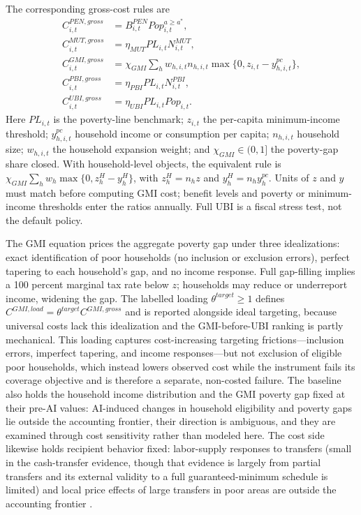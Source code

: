 \documentclass[11pt,a4paper]{article}
\begin{document}
The corresponding gross-cost rules are
\begin{align}
    C^{PEN,gross}_{i,t} &= B^{PEN}_{i,t}Pop_{i,t}^{a\geq a^*},\\
    C^{MUT,gross}_{i,t} &= \eta_{MUT}PL_{i,t}N^{MUT}_{i,t},\\
    C^{GMI,gross}_{i,t} &= \chi_{GMI}\sum_h w_{h,i,t}n_{h,i,t}\max\{0,z_{i,t}-y^{pc}_{h,i,t}\},\\
    C^{PBI,gross}_{i,t} &= \eta_{PBI}PL_{i,t}N^{PBI}_{i,t},\\
    C^{UBI,gross}_{i,t} &= \eta_{UBI}PL_{i,t}Pop_{i,t}.
\end{align}
Here $PL_{i,t}$ is the poverty-line benchmark; $z_{i,t}$ the per-capita minimum-income threshold; $y^{pc}_{h,i,t}$ household income or consumption per capita; $n_{h,i,t}$ household size; $w_{h,i,t}$ the household expansion weight; and $\chi_{GMI}\in(0,1]$ the poverty-gap share closed. With household-level objects, the equivalent rule is $\chi_{GMI}\sum_h w_h\max\{0,z^H_h-y^H_h\}$, with $z^H_h=n_h z$ and $y^H_h=n_h y^{pc}_h$. Units of $z$ and $y$ must match before computing GMI cost; benefit levels and poverty or minimum-income thresholds enter the ratios annually. Full UBI is a fiscal stress test, not the default policy.

The GMI equation prices the aggregate poverty gap under three idealizations: exact identification of poor households (no inclusion or exclusion errors), perfect tapering to each household's gap, and no income response. Full gap-filling implies a 100 percent marginal tax rate below $z$; households may reduce or underreport income, widening the gap. The labelled loading $\theta^{target}\geq1$ defines $C^{GMI,load}=\theta^{target}C^{GMI,gross}$ and is reported alongside ideal targeting, because universal costs lack this idealization and the GMI-before-UBI ranking is partly mechanical. This loading captures cost-increasing targeting frictions---inclusion errors, imperfect tapering, and income responses---but not exclusion of eligible poor households, which instead lowers observed cost while the instrument fails its coverage objective and is therefore a separate, non-costed failure.
The baseline also holds the household income distribution and the GMI poverty gap fixed at their pre-AI values: AI-induced changes in household eligibility and poverty gaps lie outside the accounting frontier, their direction is ambiguous, and they are examined through cost sensitivity rather than modeled here. The cost side likewise holds recipient behavior fixed: labor-supply responses to transfers (small in the cash-transfer evidence, though that evidence is largely from partial transfers and its external validity to a full guaranteed-minimum schedule is limited) and local price effects of large transfers in poor areas are outside the accounting frontier \citep{gentilini2020ubi,oecd2017basicincome}.
\end{document}
